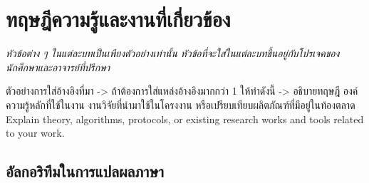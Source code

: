 \chapter{ทฤษฎีความรู้และงานที่เกี่ยวข้อง}

\emph{หัวข้อต่าง ๆ ในแต่ละบทเป็นเพียงตัวอย่างเท่านั้น หัวข้อที่จะใส่ในแต่ละบทขึ้นอยู่กับโปรเจคของนักศึกษาและอาจารย์ที่ปรึกษา}

ตัวอย่างการใส่อ้างอิงที่มา -> \cite{hypersense} ถ้าต้องการใส่แหล่งอ้างอิงมากกว่า 1 ให้ทำดังนี้ -> \cite{hypersense,bworld}
อธิบายทฤษฎี องค์ความรู้หลักที่ใช้ในงาน งานวิจัยที่นำมาใช้ในโครงงาน หรือเปรียบเทียบผลิตภัณฑ์ที่มีอยู่ในท้องตลาด\cite{bworld}
Explain theory, algorithms, protocols, or existing research works and tools related to your work.




\section{อัลกอริทึมในการแปลผลภาษา}
